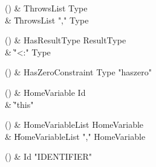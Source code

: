 \begin{bbgrammarappendix}{3.3in}

() & ThrowsList \label{prod:ThrowsList}  \: Type  \\

 &    \| ThrowsList \xcd"," Type \\

\end{bbgrammarappendix}

\begin{bbgrammarappendix}{3.7in}

() & HasResultType \label{prod:HasResultType}  \: ResultType  \\

 &    \| \xcd"<:" Type \\

\end{bbgrammarappendix}

\begin{bbgrammarappendix}{3.3in}

() & HasZeroConstraint \label{prod:HasZeroConstraint}  \: Type  \xcd"haszero"  \\


\end{bbgrammarappendix}

\begin{bbgrammarappendix}{3.8in}

() & HomeVariable \label{prod:HomeVariable}  \: Id  \\

 &    \| \xcd"this" \\

\end{bbgrammarappendix}

\begin{bbgrammarappendix}{3.4in}

() & HomeVariableList \label{prod:HomeVariableList}  \: HomeVariable  \\

 &    \| HomeVariableList \xcd"," HomeVariable \\

\end{bbgrammarappendix}

\begin{bbgrammarappendix}{4.8in}

() & Id \label{prod:Id}  \: \xcd"IDENTIFIER"   \\


\end{bbgrammarappendix}

